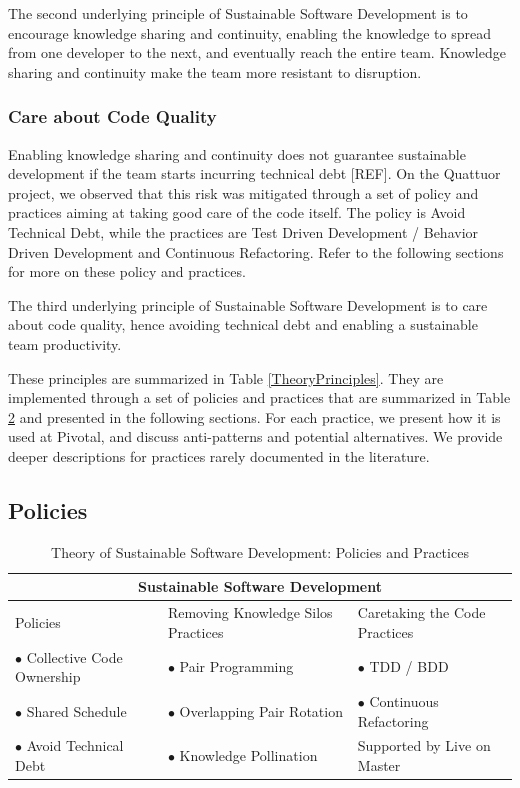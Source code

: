 \begin{table}[]
The second underlying principle of Sustainable Software Development is to encourage knowledge sharing and continuity, enabling the knowledge to spread from one developer to the next, and eventually reach the entire team. Knowledge sharing and continuity make the team more resistant to disruption. 

\subsubsection{Care about Code Quality}

Enabling knowledge sharing and continuity does not guarantee sustainable development if the team starts incurring technical debt [REF]. On the Quattuor project, we observed that this risk was mitigated through a set of policy and practices aiming at taking good care of the code itself. The policy is Avoid Technical Debt, while the practices are Test Driven Development / Behavior Driven Development and Continuous Refactoring. Refer to the following sections for more on these policy and practices.

The third underlying principle of Sustainable Software Development is to care about code quality, hence avoiding technical debt and enabling a sustainable team productivity.

These principles are summarized in Table \ref{TheoryPrinciples}. They are implemented through a set of policies and practices that are summarized in Table \ref{TheoryPractices} and presented in the following sections. For each practice, we present how it is used at Pivotal, and discuss anti-patterns and potential alternatives. We provide deeper descriptions for practices rarely documented in the literature.
\subsection{Policies}

\begin{table}[]
\renewcommand{\arraystretch}{1.5}
\centering
\caption{Theory of Sustainable Software Development: Policies and Practices}
\label{TheoryPractices}
\begin{tabular}{l|l|l}
\hline
\multicolumn{3}{c}{Sustainable Software Development}                               \\
\hline
Policies                  & Removing Knowledge Silos Practices & Caretaking the Code Practices         \\
$\bullet$ Collective Code Ownership & $\bullet$ Pair Programming         & $\bullet$  TDD / BDD                   \\
$\bullet$ Shared Schedule           & $\bullet$ Overlapping Pair Rotation & $\bullet$ Continuous Refactoring      \\
$\bullet$ Avoid Technical Debt      & $\bullet$  Knowledge Pollination    & Supported by Live on Master \\ 
\hline
\end{tabular}
\end{table}


\end{table}
